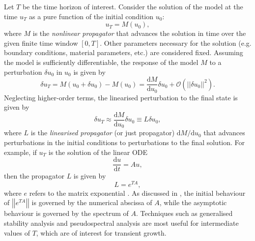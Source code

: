 \documentclass{siamltex}
\begin{document}
Let $T$ be the time horizon of interest. Consider the solution of the model at the time $u_T$ as a pure function of the initial condition $u_0$:
\begin{equation} \label{eq:nonlinear_propagator}
u_T = M(u_0),
\end{equation}
where $M$ is the \emph{nonlinear propagator} that advances the solution in time over the given finite time window $[0, T]$.
Other parameters necessary for the solution (e.g. boundary conditions, material parameters, etc.)
are considered fixed. Assuming the model is sufficiently differentiable, the response of the 
model $M$ to a perturbation $\delta u_0$ in $u_0$ is given by
\begin{equation}
\delta u_T = M(u_0 + \delta u_0) - M(u_0) = \frac{\textrm{d} M}{\textrm{d} u_0} \delta u_0 +
\mathcal{O}\left(\left|\left|\delta u_0\right|\right|^2\right).
\end{equation}
Neglecting higher-order terms, the linearised perturbation to the final state is given by
\begin{equation}
\delta u_T \approx \frac{\textrm{d} M}{\textrm{d} u_0} \delta u_0 \equiv L \delta u_0,
\end{equation}
where $L$ is the \emph{linearised propagator} (or just propagator) ${\textrm{d} M}/{\textrm{d} u_0}$
that advances perturbations in the initial conditions to perturbations to the final solution. For example, if $u_T$ is the solution
of the linear ODE
\begin{equation}
  \frac{\mathrm{d} u}{\mathrm{d} t} = Au,
\end{equation}
then the propagator $L$ is given by
\begin{equation}
  L = e^{TA},
\end{equation}
where $e$ refers to the matrix exponential \cite{moler2003}. As discussed in \cite[figure 14.1]{trefethen2006}, 
the initial behaviour of $\left|\left|e^{TA}\right|\right|$ is governed by the numerical abscissa of $A$, while the asymptotic behaviour is governed by the spectrum of $A$. 
Techniques such as generalised stability analysis and pseudospectral analysis are most useful for intermediate values of $T$, which are of interest for transient growth.
\end{document}
